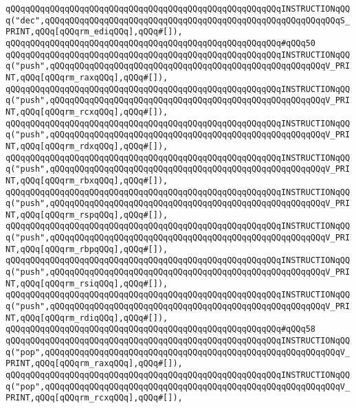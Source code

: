 \verb|qQQqqQQqqQQqqQQqqQQqqQQqqQQqqQQqqQQqqQQqqQQqqQQqqQQqqQQqINSTRUCTIONqQQq("dec",qQQqqQQqqQQqqQQqqQQqqQQqqQQqqQQqqQQqqQQqqQQqqQQqqQQqqQQqqQQqS_PRINT,qQQq[qQQqrm_ediqQQq],qQQq#[]),|\newline
\verb|qQQqqQQqqQQqqQQqqQQqqQQqqQQqqQQqqQQqqQQqqQQqqQQqqQQqqQQq#qQQq50|\newline
\verb|qQQqqQQqqQQqqQQqqQQqqQQqqQQqqQQqqQQqqQQqqQQqqQQqqQQqqQQqINSTRUCTIONqQQq("push",qQQqqQQqqQQqqQQqqQQqqQQqqQQqqQQqqQQqqQQqqQQqqQQqqQQqqQQqV_PRINT,qQQq[qQQqrm_raxqQQq],qQQq#[]),|\newline
\verb|qQQqqQQqqQQqqQQqqQQqqQQqqQQqqQQqqQQqqQQqqQQqqQQqqQQqqQQqINSTRUCTIONqQQq("push",qQQqqQQqqQQqqQQqqQQqqQQqqQQqqQQqqQQqqQQqqQQqqQQqqQQqqQQqV_PRINT,qQQq[qQQqrm_rcxqQQq],qQQq#[]),|\newline
\verb|qQQqqQQqqQQqqQQqqQQqqQQqqQQqqQQqqQQqqQQqqQQqqQQqqQQqqQQqINSTRUCTIONqQQq("push",qQQqqQQqqQQqqQQqqQQqqQQqqQQqqQQqqQQqqQQqqQQqqQQqqQQqqQQqV_PRINT,qQQq[qQQqrm_rdxqQQq],qQQq#[]),|\newline
\verb|qQQqqQQqqQQqqQQqqQQqqQQqqQQqqQQqqQQqqQQqqQQqqQQqqQQqqQQqINSTRUCTIONqQQq("push",qQQqqQQqqQQqqQQqqQQqqQQqqQQqqQQqqQQqqQQqqQQqqQQqqQQqqQQqV_PRINT,qQQq[qQQqrm_rbxqQQq],qQQq#[]),|\newline
\verb|qQQqqQQqqQQqqQQqqQQqqQQqqQQqqQQqqQQqqQQqqQQqqQQqqQQqqQQqINSTRUCTIONqQQq("push",qQQqqQQqqQQqqQQqqQQqqQQqqQQqqQQqqQQqqQQqqQQqqQQqqQQqqQQqV_PRINT,qQQq[qQQqrm_rspqQQq],qQQq#[]),|\newline
\verb|qQQqqQQqqQQqqQQqqQQqqQQqqQQqqQQqqQQqqQQqqQQqqQQqqQQqqQQqINSTRUCTIONqQQq("push",qQQqqQQqqQQqqQQqqQQqqQQqqQQqqQQqqQQqqQQqqQQqqQQqqQQqqQQqV_PRINT,qQQq[qQQqrm_rbpqQQq],qQQq#[]),|\newline
\verb|qQQqqQQqqQQqqQQqqQQqqQQqqQQqqQQqqQQqqQQqqQQqqQQqqQQqqQQqINSTRUCTIONqQQq("push",qQQqqQQqqQQqqQQqqQQqqQQqqQQqqQQqqQQqqQQqqQQqqQQqqQQqqQQqV_PRINT,qQQq[qQQqrm_rsiqQQq],qQQq#[]),|\newline
\verb|qQQqqQQqqQQqqQQqqQQqqQQqqQQqqQQqqQQqqQQqqQQqqQQqqQQqqQQqINSTRUCTIONqQQq("push",qQQqqQQqqQQqqQQqqQQqqQQqqQQqqQQqqQQqqQQqqQQqqQQqqQQqqQQqV_PRINT,qQQq[qQQqrm_rdiqQQq],qQQq#[]),|\newline
\verb|qQQqqQQqqQQqqQQqqQQqqQQqqQQqqQQqqQQqqQQqqQQqqQQqqQQqqQQq#qQQq58|\newline
\verb|qQQqqQQqqQQqqQQqqQQqqQQqqQQqqQQqqQQqqQQqqQQqqQQqqQQqqQQqINSTRUCTIONqQQq("pop",qQQqqQQqqQQqqQQqqQQqqQQqqQQqqQQqqQQqqQQqqQQqqQQqqQQqqQQqqQQqV_PRINT,qQQq[qQQqrm_raxqQQq],qQQq#[]),|\newline
\verb|qQQqqQQqqQQqqQQqqQQqqQQqqQQqqQQqqQQqqQQqqQQqqQQqqQQqqQQqINSTRUCTIONqQQq("pop",qQQqqQQqqQQqqQQqqQQqqQQqqQQqqQQqqQQqqQQqqQQqqQQqqQQqqQQqqQQqV_PRINT,qQQq[qQQqrm_rcxqQQq],qQQq#[]),|\newline

